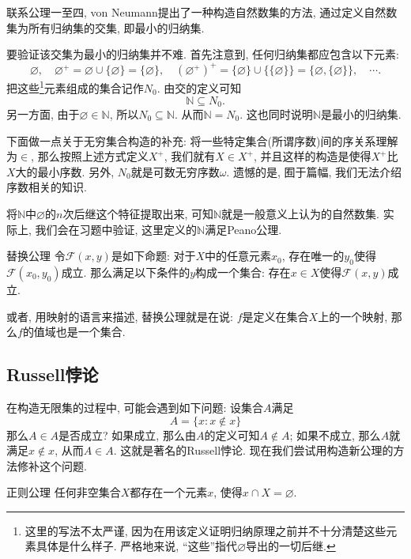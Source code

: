 联系公理一至四, von Neumann提出了一种构造自然数集的方法, 通过定义自然数集为所有归纳集的交集, 即最小的归纳集. 

要验证该交集为最小的归纳集并不难. 首先注意到, 任何归纳集都应包含以下元素: $$\varnothing , \quad \varnothing ^{+}=\varnothing \cup \{ \varnothing \}=\{ \varnothing \} , \quad (\varnothing ^{+})^{+} = \{ \varnothing \} \cup \{ \{ \varnothing \} \} = \{ \varnothing ,  \{ \varnothing \}\} , \quad \cdots .$$
把这些\footnote{这里的写法不太严谨, 因为在用该定义证明归纳原理之前并不十分清楚这些元素具体是什么样子. 严格地来说, “这些”指代$\varnothing$导出的一切后继. }元素组成的集合记作$N_0$. 由交的定义可知$$\mathbb{N} \subseteq N_0.$$
另一方面, 由于$\varnothing \in \mathbb{N}$, 所以$N_0 \subseteq \mathbb{N}$. 从而$\mathbb{N} = N_0$. 这也同时说明$\mathbb{N}$是最小的归纳集.

\begin{remark}
	下面做一点关于无穷集合构造的补充: 将一些特定集合(所谓序数)间的序关系理解为$\in$, 那么按照上述方式定义$X^+$, 我们就有$X \in X^+$, 并且这样的构造是使得$X^+$比$X$大的最小序数. 另外, $N_0$就是可数无穷序数$\omega$. 遗憾的是, 囿于篇幅, 我们无法介绍序数相关的知识. 
\end{remark}

将$\mathbb{N}$中$\varnothing$的$n$次后继这个特征提取出来, 可知$\mathbb{N}$就是一般意义上认为的自然数集. 实际上, 我们会在习题中验证, 这里定义的$\mathbb{N}$满足Peano公理. 

\begin{axiom}{替换公理}
	令$\mathcal{F}(x, y)$是如下命题: 对于$X$中的任意元素$x_0$, 存在唯一的$y_0$使得$\mathcal{F}(x_0, y_0)$成立. 那么满足以下条件的$y$构成一个集合: 存在$x \in X$使得$\mathcal{F}(x, y)$成立.
\end{axiom}

或者, 用映射的语言来描述, 替换公理就是在说: $f$是定义在集合$X$上的一个映射, 那么$f$的值域也是一个集合.

\subsection{Russell悖论}

在构造无限集的过程中, 可能会遇到如下问题: 设集合$A$满足$$A = \{ x: x \notin x \}$$
	那么$A \in A$是否成立? 如果成立, 那么由$A$的定义可知$A \notin A$; 如果不成立, 那么$A$就满足$x \notin x$, 从而$A \in A$. 这就是著名的Russell悖论. 现在我们尝试用构造新公理的方法修补这个问题.

\begin{axiom}{正则公理}
	任何非空集合$X$都存在一个元素$x$, 使得$x \cap X = \varnothing$.
\end{axiom}


